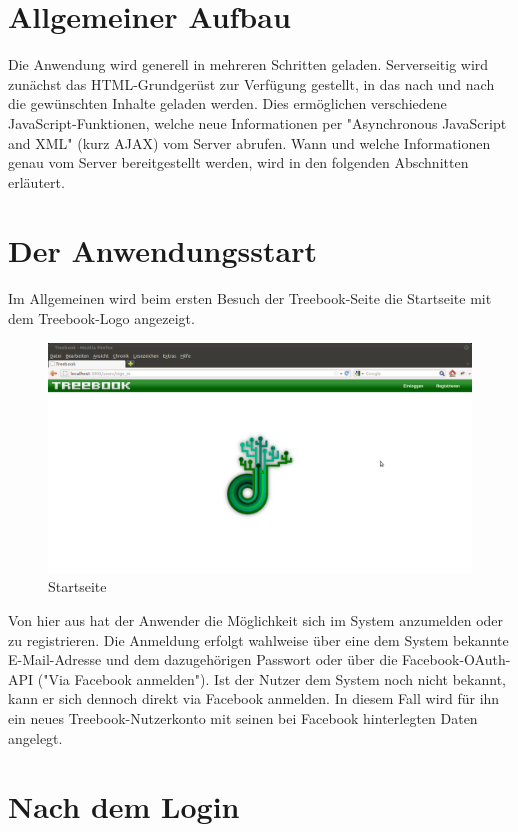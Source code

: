 \documentclass[10pt,a4paper]{book}
\makeatletter
\def\ScaleIfNeeded{%
\ifdim\Gin@nat@width>\linewidth
\linewidth
\else
\Gin@nat@width
\fi
}
\makeatother
\begin{document}
\section{Allgemeiner Aufbau}
Die Anwendung wird generell in mehreren Schritten geladen. Serverseitig wird zunächst das HTML-Grundgerüst zur Verfügung gestellt, in das nach und nach die gewünschten Inhalte geladen werden.
Dies ermöglichen verschiedene JavaScript-Funktionen, welche neue Informationen per "Asynchronous JavaScript and XML" (kurz AJAX) vom Server abrufen.
Wann und welche Informationen genau vom Server bereitgestellt werden, wird in den folgenden Abschnitten erläutert.

\section{Der Anwendungsstart}
Im Allgemeinen wird beim ersten Besuch der Treebook-Seite die Startseite mit dem Treebook-Logo angezeigt.
\begin{figure}[htbp]
\centering
\includegraphics[width=\ScaleIfNeeded]{Pictures/screen_startup.png}%
\caption{Startseite}%
\end{figure}
Von hier aus hat der Anwender die Möglichkeit sich im System anzumelden oder zu registrieren.
Die Anmeldung erfolgt wahlweise über eine dem System bekannte E-Mail-Adresse und dem dazugehörigen Passwort oder über die Facebook-OAuth-API ("Via Facebook anmelden").
Ist der Nutzer dem System noch nicht bekannt, kann er sich dennoch direkt via Facebook anmelden. In diesem Fall wird für ihn ein neues Treebook-Nutzerkonto mit seinen bei Facebook hinterlegten Daten angelegt.

\section{Nach dem Login}
\end{document}
